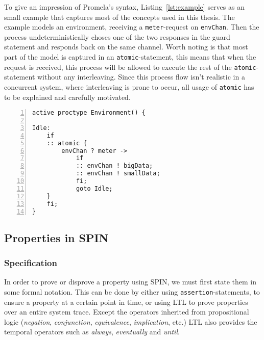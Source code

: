To give an impression of Promela's syntax, Listing~\ref{lst:example} serves as an small example that captures most of the concepts used in this thesis. The example models an environment, receiving a \texttt{meter}-request on \texttt{envChan}. Then the process undeterministically choses one of the two responses in the guard statement and responds back on the same channel. Worth noting is that most part of the model is captured in an \texttt{atomic}-statement, this means that when the request is received, this process will be allowed to execute the rest of the \texttt{atomic}-statement without any interleaving. 
Since this process flow isn't realistic in a concurrent system, where interleaving is prone to occur, all usage of \texttt{atomic} has to be explained and carefully motivated. 

\begin{lstlisting}[caption={Promela Example},label={lst:example},language=Promela, numbers=left, basicstyle=\footnotesize, tabsize=2]
active proctype Environment() {

Idle:  
	if
	:: atomic { 
		envChan ? meter ->  
			if
			:: envChan ! bigData;
			:: envChan ! smallData;
			fi; 
			goto Idle;
	}
	fi;
}
\end{lstlisting}

\subsection{Properties in SPIN}



\subsubsection{Specification}

In order to prove or disprove a property using SPIN, we must first state them in some formal notation. This can be done by either using \texttt{assertion}-statements, to ensure a property at a certain point in time, or using LTL to prove properties over an entire system trace. 
Except the operators inherited from propositional logic (\textit{negation}, \textit{conjunction}, \textit{equivalence}, \textit{implication}, etc.) LTL also provides the temporal operators such as \textit{always}, \textit{eventually} and \textit{until}.  

